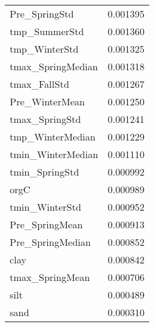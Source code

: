 \begin{tabular}{lr}
Pre_SpringStd & 0.001395 \\
tmp_SummerStd & 0.001360 \\
tmp_WinterStd & 0.001325 \\
tmax_SpringMedian & 0.001318 \\
tmax_FallStd & 0.001267 \\
Pre_WinterMean & 0.001250 \\
tmax_SpringStd & 0.001241 \\
tmp_WinterMedian & 0.001229 \\
tmin_WinterMedian & 0.001110 \\
tmin_SpringStd & 0.000992 \\
orgC & 0.000989 \\
tmin_WinterStd & 0.000952 \\
Pre_SpringMean & 0.000913 \\
Pre_SpringMedian & 0.000852 \\
clay & 0.000842 \\
tmax_SpringMean & 0.000706 \\
silt & 0.000489 \\
sand & 0.000310 \\
\bottomrule
\end{tabular}
